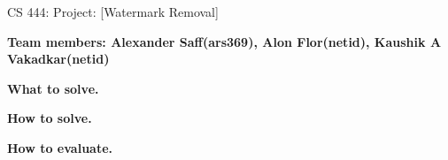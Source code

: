 \documentclass[11pt]{article}
\begin{document}
\begin{center}
\large{CS 444: Project: [Watermark Removal]}\\
\end{center}
\vspace{5mm}

\textbf{Team members: Alexander Saff(ars369), Alon Flor(netid), Kaushik A Vakadkar(netid)}




\noindent\textbf{What to solve.}
\lipsum[1]
\lipsum[2]

\textbf{How to solve.} 
\lipsum[1]


\textbf{How to evaluate.} 
\lipsum[1-2]

\newpage



\pagebreak


% 
%
% 

\end{document}
